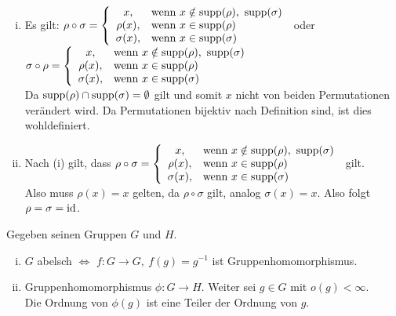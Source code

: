 \\
\begin{enumerate}[(i)]
	\item Es gilt: $\rho\circ\sigma=\left\{\begin{array}{cl} x, & \text{wenn } x\notin \operatorname{supp}(\rho),~\operatorname{supp}(\sigma)\\ \rho(x), & \text{wenn } x\in \operatorname{supp}(\rho)\\ \sigma(x), & \text{wenn } x\in \operatorname{supp}(\sigma) \end{array}\right.$
	oder 
	$\sigma\circ\rho=\left\{\begin{array}{cl} x, & \text{wenn } x\notin \operatorname{supp}(\rho),~\operatorname{supp}(\sigma)\\ \rho(x), & \text{wenn } x\in \operatorname{supp}(\rho)\\ \sigma(x), & \text{wenn } x\in \operatorname{supp}(\sigma) \end{array}\right.$\\
	
	Da $\operatorname{supp}(\rho)\cap \operatorname{supp}(\sigma)=\emptyset$ gilt und somit $x$ nicht von beiden Permutationen verändert wird. Da Permutationen bijektiv nach Definition sind, ist dies wohldefiniert.
	\item Nach (i) gilt, dass $\rho\circ\sigma=\left\{\begin{array}{cl} x, & \text{wenn } x\notin \operatorname{supp}(\rho),~\operatorname{supp}(\sigma)\\ \rho(x), & \text{wenn } x\in \operatorname{supp}(\rho)\\ \sigma(x), & \text{wenn } x\in \operatorname{supp}(\sigma) \end{array}\right.$ gilt.\\
	
	Also muss $\rho(x)=x$ gelten, da $\rho\circ\sigma$ gilt, analog $\sigma(x)=x$. Also folgt $\rho=\sigma=\operatorname{id}$.
\end{enumerate}

\newpage

\label{sub:zettel_3alg}

Gegeben seinen Gruppen $G$ und $H$.\\
\begin{enumerate}[(i)]
	\item $G$ abelsch $\Leftrightarrow$ $f:G\to G,~ f(g)=g^{-1}$ ist Gruppenhomomorphismus.
	\item Gruppenhomomorphismus $\phi:G\to H$. Weiter sei $g\in G$ mit $o(g)<\infty$.\\
	Die Ordnung von $\phi(g)$ ist eine Teiler der Ordnung von $g$.
\end{enumerate}


